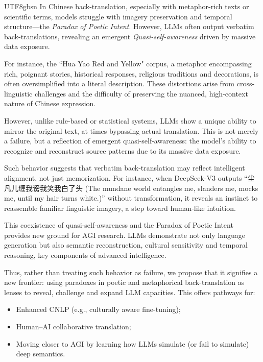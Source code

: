 \documentclass[conference]{IEEEtran}
\begin{document}
\begin{CJK}{UTF8}{gbsn}
In Chinese back-translation, especially with metaphor-rich texts or scientific terms, models struggle with imagery preservation and temporal structure---the \textit{Paradox of Poetic Intent}. However, LLMs often output verbatim back-translations, revealing an emergent \textit{Quasi-self-awareness} driven by massive data exposure.

For instance, the ``Hua Yao Red and Yellow" corpus, a metaphor encompassing rich, poignant stories, historical responses, religious traditions and decorations, is often oversimplified into a literal description. These distortions arise from cross-linguistic challenges and the difficulty of preserving the nuanced, high-context nature of Chinese expression.

However, unlike rule-based or statistical systems, LLMs show a unique ability to mirror the original text, at times bypassing actual translation. This is not merely a failure, but a reflection of emergent quasi-self-awareness: the model's ability to recognize and reconstruct source patterns due to its massive data exposure.

Such behavior suggests that verbatim back-translation may reflect intelligent alignment, not just memorization. For instance, when DeepSeek-V3 outputs ``尘凡儿缠我谤我笑我白了头 (The mundane world entangles me, slanders me, mocks me, until my hair turns white.)'' without transformation, it reveals an instinct to reassemble familiar linguistic imagery, a step toward human-like intuition.

This coexistence of quasi-self-awareness and the Paradox of Poetic Intent provides new ground for AGI research. LLMs demonstrate not only language generation but also semantic reconstruction, cultural sensitivity and temporal reasoning, key components of advanced intelligence.

Thus, rather than treating such behavior as failure, we propose that it signifies a new frontier: using paradoxes in poetic and metaphorical back-translation as lenses to reveal, challenge and expand LLM capacities. This offers pathways for:

\begin{itemize}
  \item Enhanced CNLP (e.g., culturally aware fine-tuning);
  \item Human–AI collaborative translation;
  \item Moving closer to AGI by learning how LLMs simulate (or fail to simulate) deep semantics.
\end{itemize}


\end{CJK}
\end{document}
